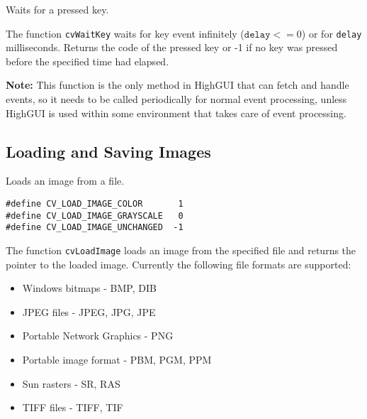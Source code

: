 
Waits for a pressed key.


\begin{description}
\end{description}

The function \texttt{cvWaitKey} waits for key event infinitely ($ \texttt{delay} <= 0$) or for \texttt{delay} milliseconds. Returns the code of the pressed key or -1 if no key was pressed before the specified time had elapsed.

\textbf{Note:} This function is the only method in HighGUI that can fetch and handle events, so it needs to be called periodically for normal event processing, unless HighGUI is used within some environment that takes care of event processing.

\subsection{Loading and Saving Images}


Loads an image from a file.


\begin{lstlisting}
#define CV_LOAD_IMAGE_COLOR       1
#define CV_LOAD_IMAGE_GRAYSCALE   0
#define CV_LOAD_IMAGE_UNCHANGED  -1
\end{lstlisting}

\begin{description}
\end{description}

The function \texttt{cvLoadImage} loads an image from the specified file and returns the pointer to the loaded image. Currently the following file formats are supported:
\begin{itemize}
\item Windows bitmaps - BMP, DIB
\item JPEG files - JPEG, JPG, JPE
\item Portable Network Graphics - PNG
\item Portable image format - PBM, PGM, PPM
\item Sun rasters - SR, RAS
\item TIFF files - TIFF, TIF
\end{itemize}

